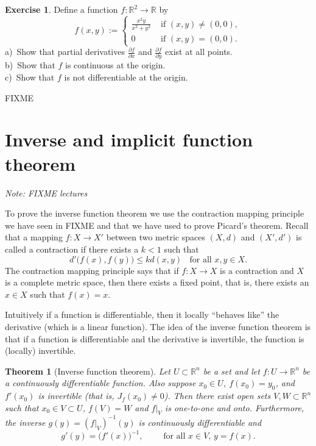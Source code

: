 \documentclass[12pt]{book}
\newcommand{\R}{{\mathbb{R}}}
\newcommand{\sectionnotes}[1]{\noindent \emph{Note: #1} \medskip \par}
\newcommand{\sectionnewpage}{\clearpage}
\theoremstyle{plain}
\newtheorem{thm}{Theorem}[section]
\theoremstyle{remark}
\theoremstyle{definition}
\theoremstyle{exercise}
\newtheorem{exercise}{Exercise}[section]
\theoremstyle{example}
\begin{document}
\begin{exercise}
Define a function $f \colon \R^2 \to \R$ by
\begin{equation*}
f(x,y)
:=
\begin{cases}
\frac{x^2y}{x^2+y^2} & \text{ if $(x,y) \not= (0,0)$}, \\
0 & \text{ if $(x,y) = (0,0)$}.
\end{cases}
\end{equation*}
a)~Show that partial derivatives 
$\frac{\partial f}{\partial x}$ and
$\frac{\partial f}{\partial y}$ exist at all points.\\
b)~Show that $f$ is continuous at the origin.\\
c)~Show that $f$ is not differentiable at the origin.
\end{exercise}

FIXME


\sectionnewpage
\section{Inverse and implicit function theorem}
\label{sec:svinvfuncthm}

\sectionnotes{FIXME lectures}

To prove the inverse function theorem we use the contraction mapping
principle we have seen in FIXME and that we have used
to prove Picard's theorem.
Recall that a mapping $f \colon X \to X'$ between two metric
spaces $(X,d)$ and $(X',d')$ is called a contraction 
if there exists a $k < 1$ such that
\begin{equation*}
d'\bigl(f(x),f(y)\bigr) \leq k d(x,y)
\ \ \ \ \text{for all } x,y \in X.
\end{equation*}
The contraction mapping principle says that if $f \colon X \to X$
is a contraction and $X$ is a complete metric space,
then there exists a fixed point, that is,
there exists an $x \in X$ such that $f(x) = x$.

Intuitively if a function is differentiable, then it
locally ``behaves like'' the derivative (which is a linear function).
The idea of the inverse function theorem is that if a function is
differentiable and the derivative is invertible, the function is
(locally) invertible.


\begin{thm}[Inverse function theorem]
Let $U \subset \R^n$ be a set and let
$f \colon U \to \R^n$ be a continuously differentiable function.
Also suppose $x_0 \in U$, $f(x_0) = y_0$, and $f'(x_0)$ is invertible
(that is, $J_f(x_0) \not=0$).
Then there exist open sets $V, W \subset \R^n$ such that
$x_0 \in V \subset U$, $f(V) = W$ and $f|_V$ is one-to-one and onto.  
Furthermore, the inverse $g(y) = (f|_V)^{-1}(y)$ is continuously differentiable
and 
\begin{equation*}
g'(y) = {\bigl(f'(x)\bigr)}^{-1}, \qquad \text{ for all $x \in V$, $y = f(x)$.}
\end{equation*}
\end{thm}
\end{document}
